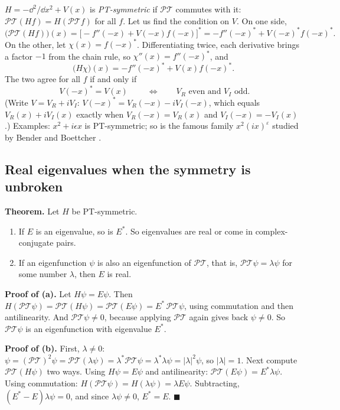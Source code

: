 $H=-\dd^2/\dd x^2+V(x)$ is \emph{PT-symmetric} if $\mathcal{PT}$ commutes with it: $\mathcal{PT}(Hf)=H(\mathcal{PT}f)$ for all $f$. Let us find the condition on $V$. On one side,
\begin{equation}
\bigl(\mathcal{PT}(Hf)\bigr)(x) = \bigl[-f''(-x)+V(-x)f(-x)\bigr]^* = -f''(-x)^*+V(-x)^*f(-x)^*.
\end{equation}
On the other, let $\chi(x)=f(-x)^*$. Differentiating twice, each derivative brings a factor $-1$ from the chain rule, so $\chi''(x)=f''(-x)^*$, and
\begin{equation}
\bigl(H\chi\bigr)(x) = -f''(-x)^* + V(x)f(-x)^* .
\end{equation}
The two agree for all $f$ if and only if
\begin{equation}
\boxed{\;V(-x)^* = V(x)\;}
\qquad\Longleftrightarrow\qquad V_R \text{ even and } V_I \text{ odd}.
\label{eq:non-hermitian-PTcondition}
\end{equation}
(Write $V=V_R+iV_I$: $V(-x)^*=V_R(-x)-iV_I(-x)$, which equals $V_R(x)+iV_I(x)$ exactly when $V_R(-x)=V_R(x)$ and $V_I(-x)=-V_I(x)$.) Examples: $x^2+i\epsilon x$ is PT-symmetric; so is the famous family $x^2(ix)^{\varepsilon}$ studied by Bender and Boettcher \cite{bender98}.

\subsection{Real eigenvalues when the symmetry is unbroken}

\textbf{Theorem.} Let $H$ be PT-symmetric.
\begin{enumerate}
\item[(a)] If $E$ is an eigenvalue, so is $E^*$. So eigenvalues are real or come in complex-conjugate pairs.
\item[(b)] If an eigenfunction $\psi$ is also an eigenfunction of $\mathcal{PT}$, that is, $\mathcal{PT}\psi=\lambda\psi$ for some number $\lambda$, then $E$ is real.
\end{enumerate}

\textbf{Proof of (a).} Let $H\psi=E\psi$. Then $H(\mathcal{PT}\psi)=\mathcal{PT}(H\psi)=\mathcal{PT}(E\psi)=E^*\,\mathcal{PT}\psi$, using commutation and then antilinearity. And $\mathcal{PT}\psi\ne0$, because applying $\mathcal{PT}$ again gives back $\psi\ne0$. So $\mathcal{PT}\psi$ is an eigenfunction with eigenvalue $E^*$.

\textbf{Proof of (b).} First, $\lambda\ne0$: $\psi=(\mathcal{PT})^2\psi=\mathcal{PT}(\lambda\psi)=\lambda^*\mathcal{PT}\psi=\lambda^*\lambda\psi=|\lambda|^2\psi$, so $|\lambda|=1$. Next compute $\mathcal{PT}(H\psi)$ two ways. Using $H\psi=E\psi$ and antilinearity: $\mathcal{PT}(E\psi)=E^*\lambda\psi$. Using commutation: $H(\mathcal{PT}\psi)=H(\lambda\psi)=\lambda E\psi$. Subtracting, $(E^*-E)\lambda\psi=0$, and since $\lambda\psi\ne0$, $E^*=E$. $\blacksquare$

